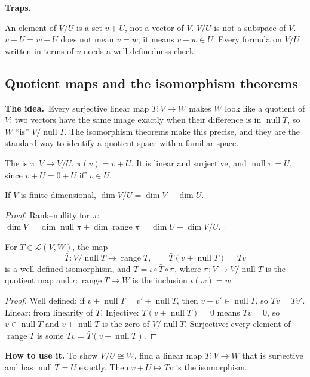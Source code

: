 \documentclass[10pt]{scrartcl}
\DeclareMathOperator{\nul}{null}
\DeclareMathOperator{\range}{range}
\newcommand{\LL}{\mathcal L}
\newcommand{\traps}{\par\medskip\noindent\textbf{\color{RawSienna}Traps.}\ }
\newcommand{\idea}{\par\noindent\textbf{\color{MidnightBlue}The idea.}\ }
\begin{document}
\traps
\begin{itemize}
  \ii An element of $V/U$ is a set $v+U$, not a vector of $V$. $V/U$ is not a subspace of $V$.
  \ii $v+U=w+U$ does not mean $v=w$; it means $v-w\in U$.
  \ii Every formula on $V/U$ written in terms of $v$ needs a well-definedness check.
\end{itemize}

\subsection{Quotient maps and the isomorphism theorems}\label{sec:iso}
\idea Every surjective linear map $T\colon V\to W$ makes $W$ look like a quotient of $V$: two vectors have the same image exactly when their difference is in $\nul T$, so $W$ ``is'' $V/\nul T$. The isomorphism theorems make this precise, and they are the standard way to identify a quotient space with a familiar space.

\begin{definition*}
  The  is $\pi\colon V\to V/U$, $\pi(v)=v+U$. It is linear and surjective, and $\nul\pi=U$, since $v+U=0+U$ iff $v\in U$.
\end{definition*}

\begin{proposition*}
  If $V$ is finite-dimensional, $\dim V/U=\dim V-\dim U$.
\end{proposition*}
\begin{proof}
  Rank--nullity for $\pi$: $\dim V=\dim\nul\pi+\dim\range\pi=\dim U+\dim V/U$.
\end{proof}

\begin{theorem*}
  For $T\in\LL(V,W)$, the map
  \[ \bar T\colon V/\nul T\to\range T,\qquad\bar T(v+\nul T)=Tv \]
  is a well-defined isomorphism, and $T=\iota\circ\bar T\circ\pi$, where $\pi\colon V\to V/\nul T$ is the quotient map and $\iota\colon\range T\to W$ is the inclusion $\iota(w)=w$.
\end{theorem*}
\begin{center}
\end{center}
\begin{proof}
  Well defined: if $v+\nul T=v'+\nul T$, then $v-v'\in\nul T$, so $Tv=Tv'$. Linear: from linearity of $T$. Injective: $\bar T(v+\nul T)=0$ means $Tv=0$, so $v\in\nul T$ and $v+\nul T$ is the zero of $V/\nul T$. Surjective: every element of $\range T$ is some $Tv=\bar T(v+\nul T)$.
\end{proof}
\textbf{How to use it.} To show $V/U\cong W$, find a linear map $T\colon V\to W$ that is surjective and has $\nul T=U$ exactly. Then $v+U\mapsto Tv$ is the isomorphism.
\end{document}

